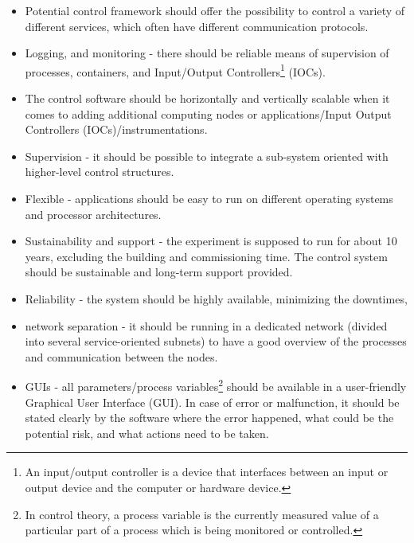  
 \begin{itemize}
    \item Potential control framework should offer the possibility to control a variety of different services, which often have different communication protocols.
    \item Logging, and monitoring - there should be reliable means of supervision of processes, containers, and Input/Output Controllers\footnote{An input/output controller is a device that interfaces between an input or output device and the computer or hardware device.} (\glspl{IOC}).
    \item The control software should be horizontally and vertically scalable when it comes to adding additional computing nodes or applications/Input Output Controllers (\glspl{IOC})/instrumentations.
    \item Supervision - it should be possible to integrate a sub-system oriented with higher-level control structures.
     \item Flexible - applications should be easy to run on different operating systems and processor architectures.
     \item Sustainability and support - the experiment is supposed to run for about 10 years, excluding the building and commissioning time. The control system should be sustainable and long-term support provided.
     \item Reliability - the system should be highly available, minimizing the downtimes,
     \item network separation - it should be running in a dedicated network (divided into several service-oriented subnets) to have a good overview of the processes and communication between the nodes.
     \item \glspl{GUI} - all parameters/process variables\footnote{In control theory, a process variable is the currently measured value of a particular part of a process which is being monitored or controlled.} should be available in a user-friendly Graphical User Interface (\gls{GUI}). In case of error or malfunction, it should be stated clearly by the software where the error happened, what could be the potential risk, and what actions need to be taken.

 \end{itemize}
\newpage

